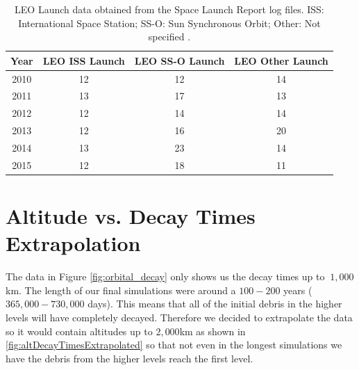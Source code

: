 \documentclass[pre,12pt]{revtex4-1}
\begin{document}
\begin{table}[htb]
\centering
    \begin{tabular}{| c | c | c | c |} \hline
    \textbf{Year} & \textbf{LEO ISS Launch} & \textbf{LEO SS-O Launch}  & \textbf{LEO Other Launch} \\ \hline
    2010 & 12 & 12 & 14\\ \hline
    2011 & 13 & 17 & 13\\ \hline
    2012 & 12 & 14 & 14\\ \hline
    2013 & 12 & 16 & 20\\ \hline
    2014 & 13 & 23 & 14\\ \hline
    2015 & 12 & 18 & 11\\ \hline
    \end{tabular}
\caption{LEO Launch data obtained from the Space Launch Report log files. ISS: International Space Station; SS-O: Sun Synchronous Orbit; Other: Not specified \cite{spaceLaunchReport}.}
\end{table}

\clearpage
\section{Altitude vs. Decay Times Extrapolation}\label{AppendixC}
The data in Figure \ref{fig:orbital_decay} only shows us the decay times up to $~1,000$km. The length of our final simulations were around a $100-200$ years ($365,000-730,000$ days). This means that all of the initial debris in the higher levels will have completely decayed. Therefore we decided to extrapolate the data so it would contain altitudes up to $2,000$km as shown in \ref{fig:altDecayTimesExtrapolated} so that not even in the longest simulations we have the debris from the higher levels reach the first level.
\end{document}
